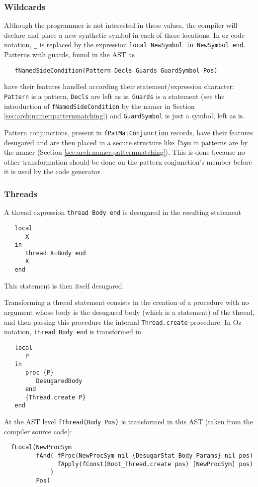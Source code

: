 \documentclass[a4paper]{memoir}
\begin{document}
\subsubsection{Wildcards}
Although the programmer is not interested in these values, the compiler will declare and place a new synthetic symbol in each of these locations. In oz code notation, \lstinline!_! is replaced by the expression \lstinline!local NewSymbol in NewSymbol end!.
Patterns with guards, found in the AST as 
\begin{lstlisting}
   fNamedSideCondition(Pattern Decls Guards GuardSymbol Pos)
\end{lstlisting}
have their features handled according their statement/expression character:
\lstinline!Pattern! is a pattern, \lstinline!Decls! are left as is,
\lstinline!Guards! is a statement (see the introduction
of \lstinline!fNamedSideCondition! by the namer in Section
\ref{sec:arch:namer:patternmatching}) and \lstinline!GuardSymbol! is just a
symbol, left as is.

Pattern conjunctions, present in \lstinline!fPatMatConjunction! records, have
their features desugared and are then placed in a secure structure like
\lstinline!fSym! in
patterns are by the namer (Section \ref{sec:arch:namer:patternmatching}).
This is done because no other transformation should be done on the pattern
conjunction's member before it is used by the code generator.


\subsubsection{Threads}
A thread expression \lstinline!thread Body end! is desugared in the resulting
statement 
\begin{lstlisting}
   local 
      X 
   in 
      thread X=Body end 
      X 
   end 
\end{lstlisting}

This statement is then itself desugared.

Transforming a thread statement consists in the creation of a procedure with no
argument whose body is the desugared body (which is a statement) of the thread,
and then passing this procedure the internal \lstinline!Thread.create!
procedure.
In Oz notation, \lstinline!thread Body end! is transformed in 
\begin{lstlisting}
   local 
      P 
   in 
      proc {P} 
         DesugaredBody 
      end 
      {Thread.create P}
   end
\end{lstlisting}
At the AST level \lstinline!fThread(Body Pos)! is transformed in this AST (taken from the compiler source code):
\begin{lstlisting}
  fLocal(NewProcSym 
         fAnd( fProc(NewProcSym nil {DesugarStat Body Params} nil pos) 
               fApply(fConst(Boot_Thread.create pos) [NewProcSym] pos)
             ) 
         Pos)
\end{lstlisting}
\end{document}
